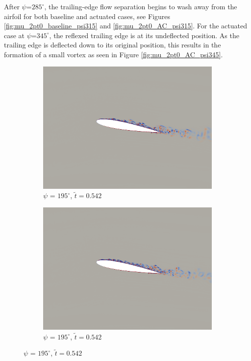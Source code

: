 After $\psi$=$285^\circ$, the trailing-edge flow separation begins to wash away from the airfoil for both baseline and actuated cases, see Figures \ref{fig:mu_2pt0_baseline_psi315} and \ref{fig:mu_2pt0_AC_psi315}. 
For the actuated case at $\psi$=$345^\circ$, the reflexed trailing edge is at its undeflected position.
As the trailing edge is deflected down to its original position, this results in the formation of a small vortex as seen in Figure \ref{fig:mu_2pt0_AC_psi345}.

\begin{figure}[H]
	\centering
	
	\begin{subfigure}[b]{0.4\textwidth}
		\centering
		\includegraphics[width=1\textwidth]{figures/mu_2pt0/vorticity/baseline/phase_195.png}
		\caption{ $\psi$ = $195^\circ$, $\tilde{t}=0.542$}
		\label{fig:mu_2pt0_baseline_psi195}
	\end{subfigure}
	\begin{subfigure}[b]{0.4\textwidth}
		\centering
		\includegraphics[width=1\textwidth]{figures/mu_2pt0/vorticity/AC/phase_195.png}
		\caption{ $\psi$ = $195^\circ$, $\tilde{t}=0.542$}
		\label{fig:mu_2pt0_AC_psi195}
	\end{subfigure}
	

\end{figure}
